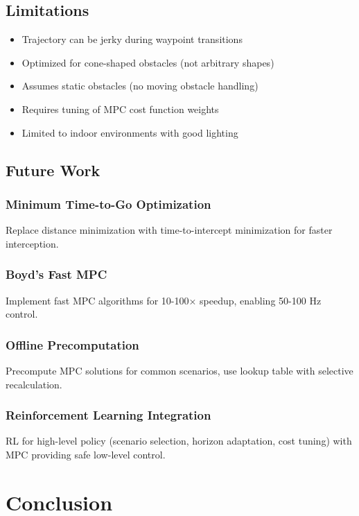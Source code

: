 \documentclass[11pt,a4paper]{article}
\begin{document}
\subsection{Limitations}

\begin{itemize}
    \item Trajectory can be jerky during waypoint transitions
    \item Optimized for cone-shaped obstacles (not arbitrary shapes)
    \item Assumes static obstacles (no moving obstacle handling)
    \item Requires tuning of MPC cost function weights
    \item Limited to indoor environments with good lighting
\end{itemize}

\subsection{Future Work}

\subsubsection{Minimum Time-to-Go Optimization}
Replace distance minimization with time-to-intercept minimization for faster interception.

\subsubsection{Boyd's Fast MPC}
Implement fast MPC algorithms for 10-100× speedup, enabling 50-100 Hz control.

\subsubsection{Offline Precomputation}
Precompute MPC solutions for common scenarios, use lookup table with selective recalculation.

\subsubsection{Reinforcement Learning Integration}
RL for high-level policy (scenario selection, horizon adaptation, cost tuning) with MPC providing safe low-level control.

\section{Conclusion}
\end{document}
